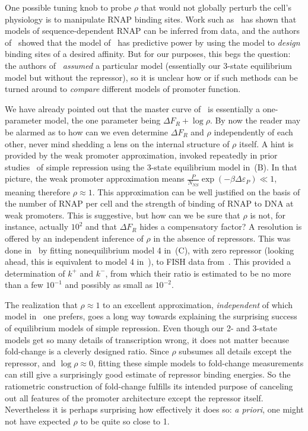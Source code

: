 One possible tuning knob to probe $\rho$ that would not globally perturb the
cell's physiology is to manipulate RNAP binding sites. Work such
as~\cite{Kinney2010} has shown that models of sequence-dependent RNAP can be
inferred from data, and the authors of~\cite{Brewster2012} showed that the model
of~\cite{Kinney2010} has predictive power by using the model to \textit{design}
binding sites of a desired affinity. But for our purposes, this begs the
question: the authors of~\cite{Kinney2010} \textit{assumed} a particular model
(essentially our 3-state equilibrium model but without the repressor), so it is
unclear how or if such methods can be turned around to \textit{compare}
different models of promoter function.

We have already pointed out that the master curve of~
is essentially a one-parameter model, the one parameter being $\Delta F_R +
\log\rho$. By now the reader may be alarmed as to how can we even determine
$\Delta F_R$ and $\rho$ independently of each other, never mind shedding a lens
on the internal structure of $\rho$ itself. A hint is provided by the weak
promoter approximation, invoked repeatedly in prior studies~\cite{Bintu2005c,
Garcia2011a, Razo-Mejia2018} of simple repression using the 3-state equilibrium
model in~(B). In that picture, the weak promoter
approximation means $\frac{P}{N_{NS}}\exp(-\beta\Delta\varepsilon_P) \ll 1$,
meaning therefore $\rho\approx1$.  This approximation can be well justified on
the basis of the number of RNAP per cell and the strength of binding of RNAP to
DNA at weak promoters. This is suggestive, but how can we be sure that $\rho$
is not, for instance, actually $10^2$ and that $\Delta F_R$ hides a compensatory
factor? A resolution is offered by an independent inference of $\rho$ in the
absence of repressors. This was done in~\cite{Razo-Mejia2020} by fitting
nonequilibrium model 4 in~(C), with zero repressor
(looking ahead, this is equivalent to model 4 in~), to
FISH data from~\cite{Brewster2014}. This provided a determination of $k^+$ and
$k^-$, from which their ratio is estimated to be no more than a few $10^{-1}$
and possibly as small as $10^{-2}$.

The realization that $\rho\approx1$ to an excellent approximation,
\textit{independent} of which model in~ one prefers,
goes a long way towards explaining the surprising success of equilibrium models
of simple repression. Even though our 2- and 3-state models get so many details
of transcription wrong, it does not matter because fold-change is a cleverly
designed ratio. Since $\rho$ subsumes all details except the repressor, and
$\log\rho\approx0$, fitting these simple models to fold-change measurements can
still give a surprisingly good estimate of repressor binding energies. So the
ratiometric construction of fold-change fulfills its intended purpose of
canceling out all features of the promoter architecture except the repressor
itself. Nevertheless it is perhaps surprising how effectively it does so:
\textit{a priori}, one might not have expected $\rho$ to be quite so close to 1.

